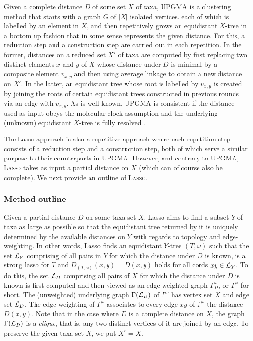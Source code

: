 Given a complete distance $D$ of some set $X$ of taxa, \textsc{UPGMA} is a
clustering method that starts with a graph $G$ of $|X|$ isolated vertices,
each of which is labelled by an element in $X$, and then repetitively grows an
equidistant $X$-tree in a bottom up fashion that in some sense represents the
given distance. For this, a reduction step and a construction step are carried
out in each repetition. In the former, distances on a reduced set $X'$ of taxa
are computed by first replacing two distinct elements $x$ and $y$ of $X$ whose
distance under $D$ is minimal by a composite element $v_{x,y}$ and then using
average linkage to obtain a new distance on $X'$. In the latter, an
equidistant tree whose root is labelled by $v_{x,y}$ is created by joining the
roots of certain equidistant trees constructed in previous rounds via an edge
with $v_{x,y}$.  As is well-known, \textsc{UPGMA} is consistent if the
distance used as input obeys the molecular clock assumption and the underlying
(unknown) equidistant $X$-tree is fully resolved \cite{durbin1998biological}.

The {\sc Lasso} approach is also a repetitive approach where each repetition
step consists of a reduction step and a construction step, both of which serve
a similar purpose to their counterparts in {\sc UPGMA}.  However, and contrary
to {\sc UPGMA}, \textsc{Lasso} takes as input a partial distance on $X$ (which
can of course also be complete). We next provide an outline of \textsc{Lasso}.

\subsubsection{Method outline}
\label{sec:method-outline}

Given a partial distance $D$ on some taxa set $X$, {\sc Lasso} aims to find a
subset $Y$ of taxa as large as possible so that the equidistant tree returned
by it is uniquely determined by the available distances on $Y$ with regards to
topology and edge-weighting.  In other words, {\sc Lasso} finds an equidistant
$Y$-tree $(T,\omega) $ such that the set ${\mathcal L}_Y$ comprising of all pairs in
$Y$ for which the distance under $D$ is known, is a strong lasso for $T$ and
$D_{(T,\omega)}(x,y) =D(x,y)$ holds for all cords $xy\in {\mathcal L}_Y$.  To do this,
the set ${\mathcal L}_D$ comprising all pairs of $X$ for which the distance under $D$
is known is first computed and then viewed as an edge-weighted graph
$\Gamma_D^{\omega}$, or $\Gamma^{\omega}$ for short. The (unweighted)
underlying graph $\Gamma({\mathcal L}_D)$ of $\Gamma^{\omega}$ has vertex set $X$ and
edge set ${\mathcal L}_D$. The edge-weighting of $\Gamma^{\omega}$ associates to every
edge $xy$ of $\Gamma^{\omega}$ the distance $D(x,y)$.  Note that in the case
where $D$ is a complete distance on $X$, the graph $\Gamma({\mathcal L}_D)$ is a {\em
  clique}, that is, any two distinct vertices of it are joined by an edge. To
preserve the given taxa set $X$, we put $X^r=X$.

